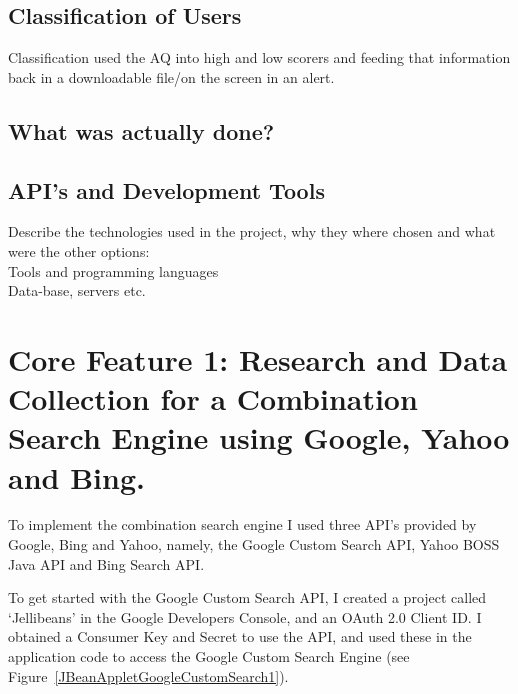 \documentclass[a4paper, 11pt]{article}
\begin{document}
\subsection{Classification of Users}
Classification used the AQ into high and low scorers and feeding that information back in a downloadable file/on the screen in an alert.



\subsection{What was actually done?}

\subsection{API's and Development Tools}
Describe the technologies used in the project, why they where
chosen and what were the other options:\\
Tools and programming languages\\
Data-base, servers etc.


\section{Core Feature 1: Research and Data Collection for a Combination Search Engine using Google, Yahoo and Bing.}

To implement the combination search engine I used three API’s provided by Google, Bing and Yahoo, namely, the Google Custom Search API, Yahoo BOSS Java API and Bing Search API. 

To get started with the Google Custom Search API, I created a project called ‘Jellibeans’ in the Google Developers Console, and an OAuth 2.0 Client ID. I obtained a Consumer Key and Secret to use the API, and used these in the application code to access the Google Custom Search Engine (see Figure~\ref{JBeanAppletGoogleCustomSearch1}). 
\end{document}
